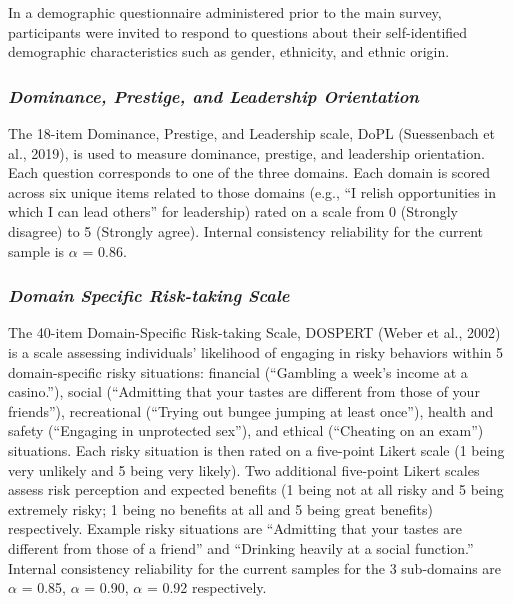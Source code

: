 \documentclass[
  english,
  ,doc, 12pt, a4paper,floatsintext]{apa7}
\begin{document}
In a demographic questionnaire administered prior to the main survey, participants were invited to respond to questions about their self-identified demographic characteristics such as gender, ethnicity, and ethnic origin.

\hypertarget{dominance-prestige-and-leadership-orientation-1}{%
\subsubsection{\texorpdfstring{\emph{Dominance, Prestige, and Leadership Orientation}}{Dominance, Prestige, and Leadership Orientation}}\label{dominance-prestige-and-leadership-orientation-1}}

The 18-item Dominance, Prestige, and Leadership scale, DoPL (Suessenbach et al., 2019), is used to measure dominance, prestige, and leadership orientation. Each question corresponds to one of the three domains. Each domain is scored across six unique items related to those domains (e.g., ``I relish opportunities in which I can lead others'' for leadership) rated on a scale from 0 (Strongly disagree) to 5 (Strongly agree). Internal consistency reliability for the current sample is \(\alpha\) = 0.86.

\hypertarget{domain-specific-risk-taking-scale}{%
\subsubsection{\texorpdfstring{\emph{Domain Specific Risk-taking Scale}}{Domain Specific Risk-taking Scale}}\label{domain-specific-risk-taking-scale}}

The 40-item Domain-Specific Risk-taking Scale, DOSPERT (Weber et al., 2002) is a scale assessing individuals' likelihood of engaging in risky behaviors within 5 domain-specific risky situations: financial (``Gambling a week's income at a casino.''), social (``Admitting that your tastes are different from those of your friends''), recreational (``Trying out bungee jumping at least once''), health and safety (``Engaging in unprotected sex''), and ethical (``Cheating on an exam'') situations. Each risky situation is then rated on a five-point Likert scale (1 being very unlikely and 5 being very likely). Two additional five-point Likert scales assess risk perception and expected benefits (1 being not at all risky and 5 being extremely risky; 1 being no benefits at all and 5 being great benefits) respectively. Example risky situations are ``Admitting that your tastes are different from those of a friend'' and ``Drinking heavily at a social function.'' Internal consistency reliability for the current samples for the 3 sub-domains are \(\alpha\) = 0.85, \(\alpha\) = 0.90, \(\alpha\) = 0.92 respectively.
\end{document}
